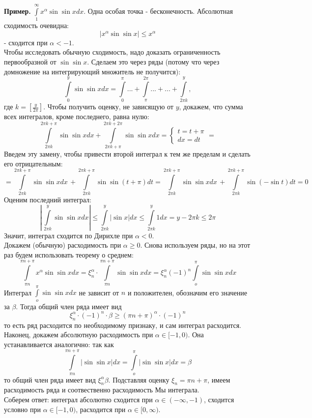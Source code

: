 \textbf{Пример.} $\int\limits_{1}^{\infty}x^\alpha\sin\sin xdx$. Одна особая
точка - бесконечность. Абсолютная сходимость очевидна:
$$|x^\alpha\sin\sin x|\leqslant x^\alpha$$
- сходится при $\alpha<-1$.\\
Чтобы исследовать обычную сходимость, надо доказать ограниченность 
первообразной от $\sin\sin x$. Сделаем это через ряды (потому что через
домножение на интегрирующий множитель не получится):
$$\int\limits_{0}^{y} \sin\sin x dx=\int\limits_{0}^{\pi}...+
\int\limits_{\pi}^{2\pi}...+...+\int\limits_{2\pi k}^{y},$$ 
где $k=\left[ \frac{y}{2\pi} \right]$. Чтобы получить оценку, не зависящую 
от $y$, докажем, что сумма всех интегралов, кроме последнего, равна нулю:
$$\int\limits_{2\pi k}^{2\pi k+\pi}\sin\sin xdx+
\int\limits_{2\pi k+\pi}^{2\pi k+2\pi}\sin\sin xdx=
\begin{cases}t=t+\pi\\dx=dt\end{cases}=$$
Введем эту замену, чтобы привести второй интеграл к тем же пределам и 
сделать его отрицательным:
$$=\int\limits_{2\pi k}^{2\pi k+\pi}\sin\sin xdx\,+
\int\limits_{2\pi k}^{2\pi k+\pi}\sin\sin (t+\pi)dt=
\int\limits_{2\pi k}^{2\pi k+\pi}\sin\sin xdx\,+
\int\limits_{2\pi k}^{2\pi k+\pi}\sin(-\sin t) dt=0$$
Оценим последний интеграл:
$$\left|\,\int\limits_{2\pi k}^{y}\sin\sin xdx\right| \leqslant 
\int\limits_{2\pi k}^{y}|\sin x|dx\leqslant \int\limits_{2\pi k}^{y}1dx=
y-2\pi k\leqslant 2\pi$$
Значит, интеграл сходится по Дирихле при $\alpha<0$.\\
Докажем (обычную) расходимость при $\alpha\geqslant 0$. 
Снова используем ряды, но на 
этот раз будем использовать теорему о среднем:
$$\int\limits_{\pi n}^{\pi n+\pi}x^\alpha\sin\sin xdx=\xi^\alpha_n\cdot 
\int\limits_{\pi n}^{\pi n+\pi}\sin\sin xdx=\xi^\alpha_n(-1)^n
 \int\limits_{o}^{\pi}\sin\sin xdx$$
Интеграл $\int\limits_{o}^{\pi}\sin\sin xdx$ не зависит от  $n$ и положителен, 
обозначим его значение за  $\beta$. Тогда общий член ряда имеет вид
$$\xi^\alpha_n\cdot (-1)^n\cdot\beta\geqslant (\pi n+\pi)^\alpha\cdot(-1)^n$$
то есть ряд расходится по необходимому признаку, и сам интеграл расходится.\\
Наконец, докажем абсолютную расходимость при $\alpha\in[-1,0)$. Она 
устанавливается аналогично: так как
$$\int\limits_{\pi n}^{\pi n+\pi}|\sin\sin x|dx=
 \int\limits_{o}^{\pi}|\sin\sin x|dx=\beta$$
 то общий член ряда имеет вид $\xi^\alpha_n\beta$. Подставляя оценку
 $\xi_n=\pi n+\pi$, имеем расходимость ряда и соотвественно расходимость 
Мы  интеграла.\\
Соберем ответ: интеграл абсолютно сходится при $\alpha\in (-\infty,-1)$,
сходится условно при $\alpha\in [-1,0)$, расходится при 
$\alpha\in [0,\infty)$. 

